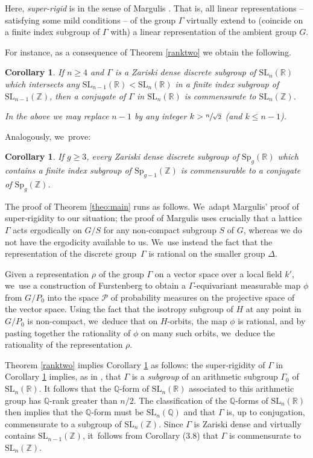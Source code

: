 \documentclass[JEP,XML,SOM,Unicode,published]{cedram}
\newtheorem{corollary}[theorem]{Corollary}
\theoremstyle{definition}
\newcommand{\field}[1]{\mathbb{#1}}
\newcommand{\Q}{\field{Q}}
\newcommand{\R}{\field{R}}
\newcommand{\Z}{\field{Z}}
\newcommand{\SL}{\mathrm{SL}}
\newcommand{\Sp}{\mathrm{Sp}}
\begin{document}
Here, \emph{super-rigid} is in the sense of Margulis \cite{M}. That is, all linear representations -- satisfying some mild conditions -- of the group $\Gamma$ virtually extend to (\ie coincide on a finite index
subgroup of $\Gamma$ with) a linear representation of the ambient group $G$.

For instance, as a consequence of Theorem \ref{ranktwo} we obtain the following.

\begin{corollary} \label{SLn} If $n\geq 4$ and $\Gamma$ is a Zariski dense discrete subgroup of $\SL_n(\R)$
which intersects any $\SL_{n-1}(\R)<\SL_{n}(\R)$ in a finite index subgroup of $\SL_{n-1}(\Z)$, then a conjugate of $\Gamma$ in $\SL_n(\R)$ is commensurate to $\SL_n(\Z)$.

In the above we may replace $n-1$ by any integer $k>\sfrac{n}{{\sqrt 2}}$ (and $k\leq n-1$).
\end{corollary}

Analogously, we~prove:

\begin{corollary} \label{Spn} If $g\geq 3$, every Zariski dense discrete
subgroup of $\Sp_g(\R)$ which contains a finite index subgroup of
$\Sp_{g-1}(\Z)$ is commensurable to a conjugate of $\Sp_g(\Z)$.
\end{corollary}

The proof of Theorem \ref{theo:main} runs as follows. We~adapt Margulis' proof of super-rigidity to our situation; the proof of Margulis uses crucially that a lattice
$\Gamma $ acts ergodically on $G/S$ for any non-compact subgroup $S$ of $G$, whereas we do not
have the ergodicity available to us. We~use instead the fact that the representation of the discrete group~$\Gamma $ is rational on the smaller group $\Delta$.

Given a representation $\rho $ of the group $\Gamma $ on a vector space over a local field $k'$, we~use a construction of Furstenberg to obtain a $\Gamma $-equivariant measurable map $\phi $ from $G/P_0$
into the space ${\mathcal P}$ of probability measures on the projective space of the vector space. Using the fact that the isotropy
subgroup of $H$ at any point in $G/P_0$ is non-compact, we~deduce that on $H$-orbits, the map $\phi$ is rational, and by pasting together the rationality of $\phi$ on many such orbits, we~deduce the rationality
of the representation $\rho$.

Theorem \ref{ranktwo} implies Corollary \ref{SLn} as follows: the
super-rigidity of $\Gamma $ in Corollary \ref{SLn} implies, as in
\cite{M}, that $\Gamma $ is a \emph{subgroup} of an arithmetic subgroup
$\Gamma_0$ of $\SL_n(\R)$. It follows that the $\Q$-form of $\SL_n(\R)$
associated to this arithmetic group has $\Q$\nobreakdash-rank greater than
$n/2$. The classification of the $\Q$\nobreakdash-forms of $\SL_n(\R)$ then implies
that the $\Q$\nobreakdash-form must be $\SL_n(\Q)$ and that $\Gamma $ is, up to conjugation,
commensurate to a subgroup of $\SL_n(\Z)$. Since $\Gamma $ is Zariski
dense and virtually contains $\SL_{n-1}(\Z)$, it~follows from
\cite{V1} Corollary (3.8) that $\Gamma $ is commensurate to $\SL_n(\Z)$.
\end{document}
